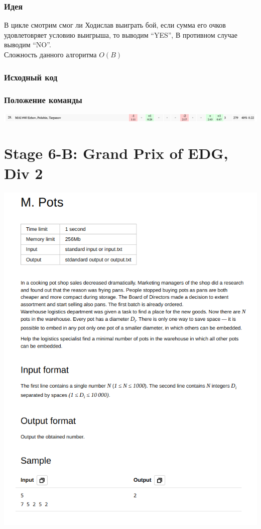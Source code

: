 \documentclass[12pt]{article}
\begin{document}
\subsubsection*{Идея}
В цикле смотрим смог ли Ходислав выиграть бой, если сумма его очков удовлетовряет условию выигрыша, то выводим “YES”, В противном случае выводим “NO”.
\\ 
Сложность данного алгоритма $O(B)$ 
\subsubsection*{Исходный код}

\subsubsection*{Положение команды}
\includegraphics[scale=0.5]{images/5.png}\newline\noindent

\pagebreak
\section{Stage 6-B: Grand Prix of EDG, Div 2}
\includegraphics[scale=0.75]{statements/6_M.png}
\end{document}
